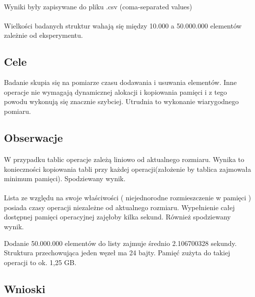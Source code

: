 \documentclass[polish, 11pt]{article}
\begin{document}
\paragraph{}
Wyniki były zapisywane do pliku .csv (coma-separated values)
\paragraph{}
Wielkości badanych struktur wahają się między 10.000 a 50.000.000 elementów zależnie od eksperymentu.

		\subsection{Cele}
			Badanie skupia się na pomiarze czasu dodawania i usuwania elementów. Inne operacje nie wymagają dynamicznej alokacji i kopiowania pamięci i z tego powodu wykonują się znacznie szybciej. Utrudnia to wykonanie wiarygodnego pomiaru.
			
		\subsection{Obserwacje}	
		\paragraph{}
		W przypadku tablic operacje zależą liniowo od aktualnego rozmiaru.	Wynika to konieczności kopiowania tabli przy każdej operacji(założenie by tablica zajmowała minimum pamięci). Spodziewany wynik.
		\paragraph{}
		Lista ze względu na swoje właściwości ( niejednorodne rozmieszczenie w pamięci ) posiada czasy operacji niezależne od aktualnego rozmiaru. Wypełnienie całej dostępnej pamięci operacyjnej zajęłoby kilka sekund.	Również spodziewany wynik.
		\par
		Dodanie 50.000.000 elementów do listy zajmuje średnio 2.106700328 sekundy. Struktura przechowująca jeden węzeł ma 24 bajty. Pamięć zużyta do takiej operacji to ok. 1,25 GB.
		
		\paragraph{}
		
	\subsection{Wnioski}	
\end{document}
